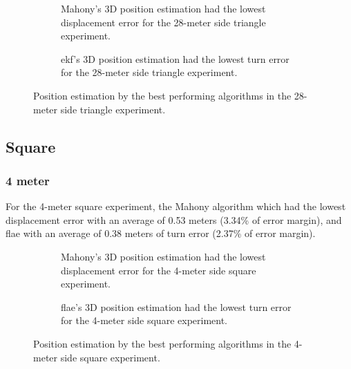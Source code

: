 \begin{figure}[H]
    \centering
    \begin{subfigure}{0.49\textwidth}
        \centering
        \resizebox{1\linewidth}{!}{}
        \caption{Mahony's 3D position estimation had the lowest displacement error for the 28-meter side triangle experiment.}
        \label{fig:triangle28_2D}
    \end{subfigure}
    \begin{subfigure}{0.49\textwidth}
        \centering
        \resizebox{1\linewidth}{!}{}
        \caption{\acrshort{ekf}'s 3D position estimation had the lowest turn error for the 28-meter side triangle experiment.}
        \label{fig:triangle28_3D}
    \end{subfigure}
    \caption{Position estimation by the best performing algorithms in the 28-meter side triangle experiment.}
    \label{fig:triangle28}
\end{figure}

\subsection{Square}


\subsubsection{4 meter}

For the 4-meter square experiment, the Mahony algorithm which had the lowest displacement error with an average of 0.53 meters (3.34\% of error margin), and \acrshort{flae} with an average of 0.38 meters of turn error (2.37\% of error margin).

\vspace{-0.5cm}

\vspace{-1.5cm}

\begin{figure}[H]
    \centering
    \begin{subfigure}{0.49\textwidth}
        \centering
        \resizebox{1\linewidth}{!}{}
        \caption{Mahony's 3D position estimation had the lowest displacement error for the 4-meter side square experiment.}

        \label{fig:square42D}
    \end{subfigure}
    \begin{subfigure}{0.49\textwidth}
        \centering
        \resizebox{1\linewidth}{!}{}
        \caption{\acrshort{flae}'s 3D position estimation had the lowest turn error for the 4-meter  side square experiment.}
        \label{fig:square43D}
    \end{subfigure}
    \caption{Position estimation by the best performing algorithms in the 4-meter side square experiment.}
    \label{fig:square4}
\end{figure}

